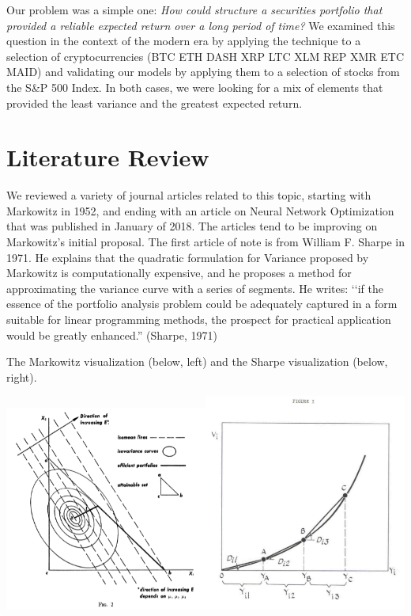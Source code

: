 \documentclass[11pt]{article} %
\begin{document}
Our problem was a simple one:\emph{ How could structure a securities portfolio that provided a reliable expected return over a long period of time?} We examined this question in the context of the modern era by applying the technique to a selection of cryptocurrencies (BTC ETH DASH XRP LTC XLM REP XMR ETC MAID) and validating our models by applying them to a selection of stocks from the S\&P 500 Index. In both cases, we were looking for a mix of elements that provided the least variance and the greatest expected return. 

\section{Literature Review}

We reviewed a variety of journal articles related to this topic, starting with Markowitz in 1952, and ending with an article on Neural Network Optimization that was published in January of 2018. The articles tend to be improving on Markowitz’s initial proposal. The first article of note is from William F. Sharpe in 1971. He explains that the quadratic formulation for Variance proposed by Markowitz is computationally expensive, and he proposes a method for approximating the variance curve with a series of segments. He writes: ‘‘if the essence of the portfolio analysis problem could be adequately captured in a form suitable for linear programming methods, the prospect for practical application would be greatly enhanced.” (Sharpe, 1971)

The Markowitz visualization (below, left) and the Sharpe visualization (below, right).

\includegraphics[width=0.5\textwidth]{mark1}\includegraphics[width=0.5\textwidth]{sharpe1}
    
\end{document}
